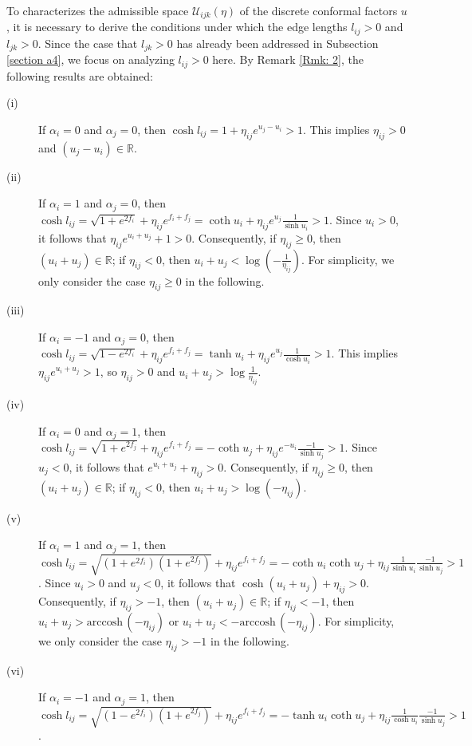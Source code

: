 \documentclass[12pt]{amsart}
\theoremstyle{definition}
\begin{document}
To characterizes the admissible space $\mathcal{U}_{ijk}(\eta)$ of the discrete conformal factors $u$,
it is necessary to derive the conditions under which the edge lengths $l_{ij}>0$ and $l_{jk}>0$.
Since the case that $l_{jk}>0$ has already been addressed in Subsection \ref{section a4}, 
we focus on analyzing $l_{ij}>0$ here.
By Remark \ref{Rmk: 2}, the following results are obtained:
\begin{description}
\item[(i)] If $\alpha_i=0$ and $\alpha_j=0$, then $\cosh l_{ij}=1+\eta_{ij}e^{u_j-u_i}>1$. 
    This implies
    $\eta_{ij}>0$ and $(u_j-u_i)\in \mathbb{R}$.
\item[(ii)] If $\alpha_i=1$ and $\alpha_j=0$, then $\cosh l_{ij}=\sqrt{1+e^{2f_i}}+\eta_{ij}e^{f_i+f_j}=\coth u_i+\eta_{ij}e^{u_j}\frac{1}{\sinh u_i}>1$.
    Since $u_i>0$, it follows that $\eta_{ij}e^{u_i+u_j}+1>0$. 
    Consequently, if $\eta_{ij}\geq0$, then $(u_i+u_j)\in \mathbb{R}$; if $\eta_{ij}<0$, then $u_i+u_j<\log(-\frac{1}{\eta_{ij}})$.
    For simplicity, we only consider the case $\eta_{ij}\geq 0$ in the following.
\item[(iii)] If $\alpha_i=-1$ and $\alpha_j=0$, then $\cosh l_{ij}=\sqrt{1-e^{2f_i}}+\eta_{ij}e^{f_i+f_j}=\tanh u_i+\eta_{ij}e^{u_j}\frac{1}{\cosh u_i}>1$. 
    This implies $\eta_{ij}e^{u_i+u_j}>1$, so $\eta_{ij}>0$ and $u_i+u_j>\log\frac{1}{\eta_{ij}}$.
\item[(iv)] If $\alpha_i=0$ and $\alpha_j=1$, then $\cosh l_{ij}=\sqrt{1+e^{2f_j}}+\eta_{ij}e^{f_i+f_j}=-\coth u_j+\eta_{ij}e^{-u_i}\frac{-1}{\sinh u_j}>1$.
    Since $u_j<0$, it follows that $e^{u_i+u_j}+\eta_{ij}>0$.
    Consequently, if $\eta_{ij}\geq0$, then $(u_i+u_j)\in \mathbb{R}$; if $\eta_{ij}<0$, then $u_i+u_j>\log(-\eta_{ij})$.
\item[(v)] If $\alpha_i=1$ and $\alpha_j=1$, then $\cosh l_{ij}=\sqrt{(1+e^{2f_i})(1+e^{2f_j})}+\eta_{ij}e^{f_i+f_j}=-\coth u_i\coth u_j+\eta_{ij}\frac{1}{\sinh u_i}\frac{-1}{\sinh u_j}>1$.
    Since $u_i>0$ and $u_j<0$, it follows that $\cosh(u_i+u_j)+\eta_{ij}>0$. 
    Consequently, if $\eta_{ij}> -1$, then $(u_i+u_j)\in \mathbb{R}$; if $\eta_{ij}<-1$, then $u_i+u_j>\mathrm{arccosh}\, (-\eta_{ij})$ or $u_i+u_j<-\mathrm{arccosh}\, (-\eta_{ij})$. 
    For simplicity, we only consider the case $\eta_{ij}>-1$ in the following.
\item[(vi)] If $\alpha_i=-1$ and $\alpha_j=1$, then $\cosh l_{ij}=\sqrt{(1-e^{2f_i})(1+e^{2f_j})}+\eta_{ij}e^{f_i+f_j}=-\tanh u_i\coth u_j+\eta_{ij}\frac{1}{\cosh u_i}\frac{-1}{\sinh u_j}>1$.

\end{description}
\end{document}
